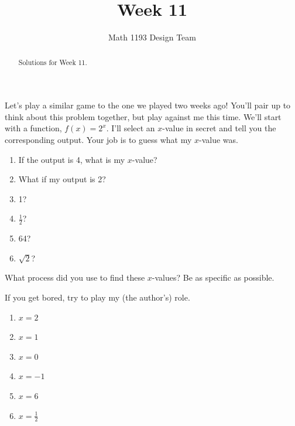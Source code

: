 \documentclass[noauthor]{ximera}
\title{Week 11}
\author{Math 1193 Design Team}
\begin{document}
\begin{abstract}
    Solutions for Week 11.
\end{abstract}
\maketitle

\begin{problem}
Let's play a similar game to the one we played two weeks ago! 
You'll pair up to think about this problem together, but play against me this time.
We'll start with a function, 
\(f\left(x\right)=2^x\). I'll select an \(x\)-value in secret and 
tell you the corresponding output. Your job is to guess what my 
\(x\)-value was. 

\begin{enumerate}
    \item If the output is 4, what is my \(x\)-value?
    \item What if my output is 2?
    \item 1?
    \item \(\frac{1}{2}\)?
    \item 64?
    \item \(\sqrt{2}\)?
\end{enumerate}

What process did you use to find these \(x\)-values? Be as specific as possible.

If you get bored, try to play my (the author's) role.

\begin{explanation}
\begin{enumerate}
\item \(x = 2\)
\item \(x = 1\)
\item \(x = 0\)
\item \(x = -1\)
\item \(x = 6\)
\item \(x = \frac{1}{2}\)
\end{enumerate}
\end{explanation}
\end{problem}
\end{document}
